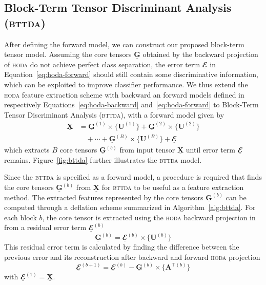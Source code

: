 \documentclass[twocolumn]{article}
\newcommand{\ten}[1]{\underline{\mathbf{#1}}} %
\newcommand{\mat}[1]{\mathbf{#1}} %
\newcommand{\mmpr}[1]{\times\{#1\}} %
\begin{document}
\subsection{Block-Term Tensor Discriminant Analysis (\textsc{bttda})}
After defining the forward model, we can construct our proposed block-term
tensor model. Assuming the core tensors $\ten{G}$
obtained by the backward projection of \textsc{hoda} do not achieve perfect
class separation, the error term $\ten{\mathbfcal{E}}$ in
Equation~\ref{eq:hoda-forward} should still contain some discriminative
information, which can be exploited to improve classifier performance.
We thus extend the \textsc{hoda} feature extraction scheme with backward an
forward models defined in respectively Equations~\ref{eq:hoda-backward}
and~\ref{eq:hoda-forward} to Block-Term Tensor Discriminant Analysis
(\textsc{bttda}), with
a forward model given by
\begin{align}
  \ten{X} & = \ten{G}^{(1)}\mmpr{\mat{U}^{(1)}} +
  \ten{G}^{(2)}\mmpr{\mat{U}^{(2)}} \\
          &\quad + \cdots + \ten{G}^{(B)}\mmpr{\mat{U}^{(B)}} + \ten{\mathbfcal{E}}
  \label{eq:bttda-forward}
\end{align}
which extracts $B$ core tensors $\ten{G}^{(b)}$ from input tensor $\ten{X}$
until error term $\ten{\mathbfcal{E}}$ remains.
Figure~\ref{fig:bttda} further illustrates the \textsc{bttda} model.
\begin{figure*}
	\centering
	
  \caption{A forward model for Block-Term Tensor Discriminant Analysis
  (\textsc{bttda}). \textsc{bttda} can extract more features
 than \textsc{hoda} by iteratively finding a core tensor $\ten{G}^{(b)}$ in a
 deflation scheme.
 The \textsc{hoda} backward projection is first applied. Next, the reconstructed
 input data is reconstructed via the \textsc{hoda} forward model and the
 difference between the two is found.
 Finally, this process is repeated with this difference as input data, until a
 desired number of blocks $B$ has been found.}
  \label{fig:bttda}
\end{figure*}

Since the \textsc{bttda} is specified as a forward model, a procedure is
required that finds the core tensors $\ten{G}^(b)$ from $\ten{X}$ for
\textsc{bttda} to be useful as a feature extraction method.
The extracted features represented by the core tensors $\ten{G}^{(b)}$ can be
computed through a deflation scheme summarized in Algorithm~\ref{alg:bttda}.
For each block $b$, the core tensor is extracted using the \textsc{hoda} backward
projection in from a residual error term
$\ten{\mathbfcal{E}}^{(b)}$
\begin{equation}
  \ten{G}^{(b)} = \ten{\mathbfcal{E}}^{(b)}\mmpr{\mat{U}^{(b)}}
\end{equation}
This residual error term is calculated by finding the difference between the
previous error and its reconstruction after backward and forward \textsc{hoda}
projection
\begin{equation}
  \ten{\mathbfcal{E}}^{(b+1)} = \ten{\mathbfcal{E}}^{(b)} - \ten{G}^{(b)}
  \mmpr{\mat{A}^{\intercal(b)}}
\end{equation}
with $\ten{\mathbfcal{E}}^{(1)}=\ten{X}$.
\end{document}
